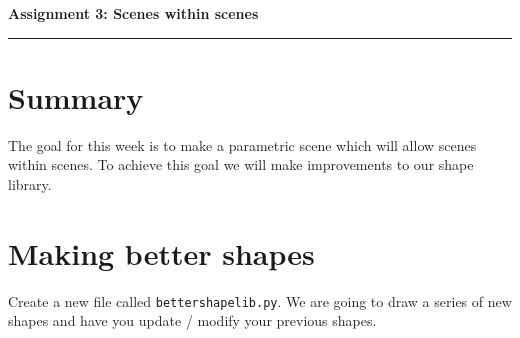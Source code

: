 \documentclass[12pt]{article}
\begin{document}
\begin{center}
  {\Large {\bf Assignment 3: Scenes within scenes}}
  
\end{center}

\vspace{5pt}
\hrule
\vspace{5pt}

\section{Summary}
The goal for this week is to make a parametric scene which will allow scenes within scenes.
To achieve this goal we will make improvements to our shape library. 

\section{Making better shapes}
Create a new file called \texttt{bettershapelib.py}.
We are going to draw a series of new shapes and have you update / modify your previous shapes. 
\end{document}
